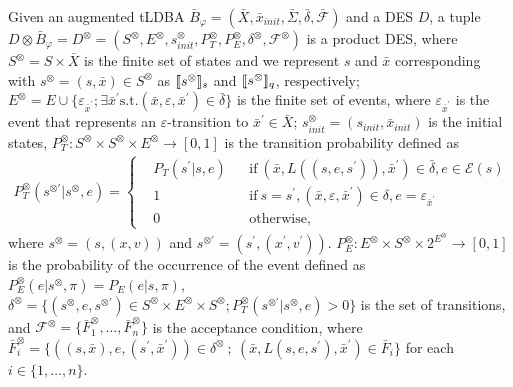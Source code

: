 \begin{definition}
  Given an augmented tLDBA $\bar{B}_{\varphi} = (\bar{X}, \bar{x}_{init},\bar{\Sigma},\bar{\delta},\bar{\mathcal{F}})$ and a DES $D$, a tuple $D \otimes \bar{B}_{\varphi} = D^{\otimes} = (S^{\otimes}, E^{\otimes}, s_{init}^{\otimes}, P^{\otimes}_T, P^{\otimes}_E, \delta^{\otimes}, {\mathcal F}^{\otimes})$ is a product DES, where
  $S^{\otimes} = S \times \bar{X}$ is the finite set of states and we represent $s$ and $\bar{x}$ corresponding with $s^{\otimes} = (s,\bar{x}) \in S^{\otimes}$ as $[\![s^{\otimes}]\!]_s$ and $[\![s^{\otimes}]\!]_q$, respectively; $E^{\otimes}=E \cup \{ \varepsilon_{\bar{x}^{\prime}} ; \exists \bar{x}^{\prime} \text{s.t.} (\bar{x}, \varepsilon, \bar{x}^{\prime}) \in \bar{\delta} \} $ is the finite set of events, where $\varepsilon_{\bar{x}^{\prime}}$ is the event that represents an $\varepsilon$-transition to $\bar{x}^{\prime} \in \bar{X}$; $s_{init}^{\otimes} = (s_{init},\bar{x}_{init})$ is the initial states, $P^{\otimes}_T : S^{\otimes} \times S^{\otimes} \times E^{\otimes} \rightarrow [0,1]$ is the transition probability defined as
  \begin{align}
    P^{\otimes}_T(s^{\otimes \prime} | s^{\otimes}, e) =
    \left\{
    \begin{aligned}
      &P_T(s^{\prime} | s, e) &   &\text{if}\  (\bar{x}, L((s,e,s^{\prime})), \bar{x}^{\prime}) \in \bar{\delta}, e \in \mathcal{E}(s) \\
      &1 &   &\text{if}\ s=s^{\prime}, (\bar{x}, \varepsilon, \bar{x}^{\prime}) \in \delta, e= \varepsilon_{\bar{x}^{\prime}} \\
      &0 &   &\text{otherwise} ,
    \end{aligned}
    \right. \nonumber
  \end{align}
  where $s^{\otimes} = (s,(x,v))$ and $s^{\otimes \prime} = (s^{\prime}, (x^{\prime}, v^{\prime}))$.
  $P^{\otimes}_E : E^{\otimes} \times S^{\otimes} \times 2^{E^{\otimes}} \rightarrow [0,1]$ is the probability of the occurrence of the event defined as $P^{\otimes}_E(e | s^{\otimes}, \pi) = P_E(e | s, \pi)$, $\delta^{\otimes} = \{ (s^{\otimes}, e, s^{\otimes \prime}) \in S^{\otimes} \times E^{\otimes} \times S^{\otimes} ; P^{\otimes}_T(s^{\otimes \prime} | s^{\otimes}, e) > 0 \}$ is the set of transitions, and ${\mathcal F}^{\otimes} = \{ \bar{F}^{\otimes}_1, \ldots ,\bar{F}^{\otimes}_n \}$ is the acceptance condition, where $\bar{F}^{\otimes}_i = \{ ((s,\bar{x}), e, (s^{\prime}, \bar{x}^{\prime})) \in \delta^{\otimes}\ ;\ (\bar{x}, L(s,e,s^{\prime}), \bar{x}^{\prime}) \in \bar{F}_i \}$ for each $ i \in \{ 1, \ldots ,n \}$.
\end{definition}

